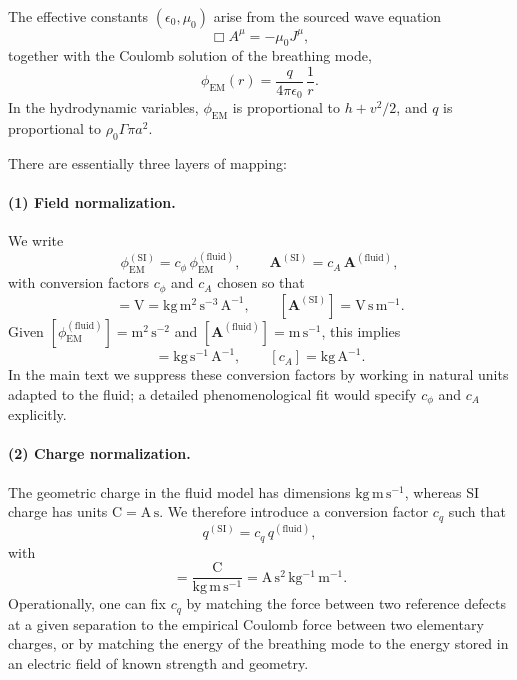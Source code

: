 \documentclass[11pt]{article}
\begin{document}
The effective constants $(\epsilon_0,\mu_0)$ arise from the sourced wave equation
\begin{equation}
\Box A^\mu = -\mu_0 J^\mu,
\end{equation}
together with the Coulomb solution of the breathing mode,
\begin{equation}
\phi_{\mathrm{EM}}(r) = \frac{q}{4\pi\epsilon_0}\,\frac{1}{r}.
\end{equation}
In the hydrodynamic variables, $\phi_{\mathrm{EM}}$ is proportional to $h + v^2/2$, and $q$ is proportional to $\rho_0 \Gamma \pi a^2$.

There are essentially three layers of mapping:

\paragraph{(1) Field normalization.}

We write
\begin{equation}
\phi_{\mathrm{EM}}^{\mathrm{(SI)}} = c_\phi\,\phi_{\mathrm{EM}}^{\mathrm{(fluid)}},
\qquad
\mathbf{A}^{\mathrm{(SI)}} = c_A\,\mathbf{A}^{\mathrm{(fluid)}},
\end{equation}
with conversion factors $c_\phi$ and $c_A$ chosen so that
\begin{equation}
[\phi_{\mathrm{EM}}^{\mathrm{(SI)}}] = \mathrm{V}
= \mathrm{kg\,m^2\,s^{-3}\,A^{-1}},
\qquad
[\mathbf{A}^{\mathrm{(SI)}}] = \mathrm{V\,s\,m^{-1}}.
\end{equation}
Given $[\phi_{\mathrm{EM}}^{\mathrm{(fluid)}}] = \mathrm{m^2\,s^{-2}}$ and $[\mathbf{A}^{\mathrm{(fluid)}}] = \mathrm{m\,s^{-1}}$, this implies
\begin{equation}
[c_\phi] = \mathrm{kg\,s^{-1}\,A^{-1}},
\qquad
[c_A] = \mathrm{kg\,A^{-1}}.
\end{equation}
In the main text we suppress these conversion factors by working in natural units adapted to the fluid; a detailed phenomenological fit would specify $c_\phi$ and $c_A$ explicitly.

\paragraph{(2) Charge normalization.}

The geometric charge in the fluid model has dimensions $\mathrm{kg\,m\,s^{-1}}$, whereas SI charge has units $\mathrm{C} = \mathrm{A\,s}$.  We therefore introduce a conversion factor $c_q$ such that
\begin{equation}
q^{\mathrm{(SI)}} = c_q\,q^{\mathrm{(fluid)}},
\end{equation}
with
\begin{equation}
[c_q] = \frac{\mathrm{C}}{\mathrm{kg\,m\,s^{-1}}}
      = \mathrm{A\,s^2\,kg^{-1}\,m^{-1}}.
\end{equation}
Operationally, one can fix $c_q$ by matching the force between two reference defects at a given separation to the empirical Coulomb force between two elementary charges, or by matching the energy of the breathing mode to the energy stored in an electric field of known strength and geometry.
\end{document}
